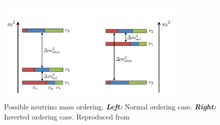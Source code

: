 \begin{figure}[ht]
  \center
  \includegraphics[width=0.8\textwidth]{images/Intro/mass-hierarchy.png}
  \caption[Possible neutrino mass ordering]{Possible neutrino mass
    ordering. \textbf{\textit{Left:}} Normal ordering
    case. \textbf{\textit{Right:}} Inverted ordering case. Reproduced
    from~\cite{massordering}}
  \label{fig:ordering}
\end{figure}





